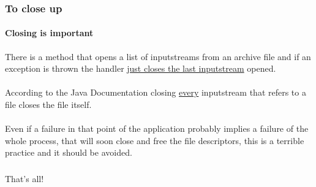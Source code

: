 \documentclass[10pt,xcolor={usenames,dvipsnames}]{beamer}
\begin{document}
\begin{frame}
	\frametitle{To close up}
	\framesubtitle{Closing is important}
	There is a method that opens a list of inputstreams from an archive file and if an exception is thrown the handler \underline{just closes the last inputstream} opened.\\
	\-\\
	According to the Java Documentation closing \underline{every} inputstream that refers to a file closes the file itself.\\
	\-\\
	Even if a failure in that point of the application probably implies a failure of the whole process, that will soon close and free the file descriptors, this is a terrible practice and it should be avoided.
\end{frame}
\begin{frame}
	\frametitle{}
	\framesubtitle{}
	{\Huge
		\begin{center}
			That's all!
		\end{center}
	}
\end{frame}
\end{document}
